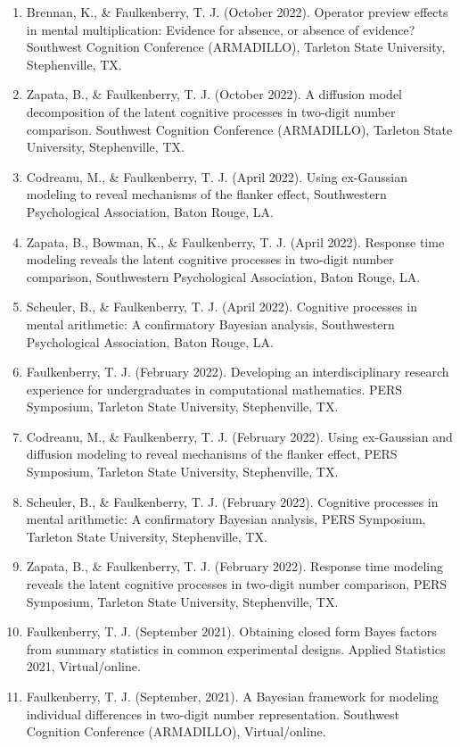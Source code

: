 \documentclass[article,10pt]{article}
\begin{document}
\begin{enumerate}
\item Brennan, K., \& Faulkenberry, T. J. (October 2022). Operator preview effects in mental multiplication: Evidence for absence, or absence of evidence? Southwest Cognition Conference (ARMADILLO), Tarleton State University, Stephenville, TX.
\item Zapata, B., \& Faulkenberry, T. J. (October 2022). A diffusion model decomposition of the latent cognitive processes in two-digit number comparison. Southwest Cognition Conference (ARMADILLO), Tarleton State University, Stephenville, TX.
\item Codreanu, M., \& Faulkenberry, T. J. (April 2022). Using ex-Gaussian modeling to reveal mechanisms of the flanker effect, Southwestern Psychological Association, Baton Rouge, LA.
\item Zapata, B., Bowman, K., \& Faulkenberry, T. J. (April 2022). Response time modeling reveals the latent cognitive processes in two-digit number comparison, Southwestern Psychological Association, Baton Rouge, LA.
\item Scheuler, B., \& Faulkenberry, T. J. (April 2022). Cognitive processes in mental arithmetic: A confirmatory Bayesian analysis, Southwestern Psychological Association, Baton Rouge, LA.
\item Faulkenberry, T. J. (February 2022). Developing an interdisciplinary research experience for undergraduates in computational mathematics. PERS Symposium, Tarleton State University, Stephenville, TX.
\item Codreanu, M., \& Faulkenberry, T. J. (February 2022). Using ex-Gaussian and diffusion modeling to reveal mechanisms of the flanker effect, PERS Symposium, Tarleton State University, Stephenville, TX.
\item Scheuler, B., \& Faulkenberry, T. J. (February 2022). Cognitive processes in mental arithmetic: A confirmatory Bayesian analysis, PERS Symposium, Tarleton State University, Stephenville, TX.
\item Zapata, B., \& Faulkenberry, T. J. (February 2022). Response time modeling reveals the latent cognitive processes in two-digit number comparison, PERS Symposium, Tarleton State University, Stephenville, TX.
\item Faulkenberry, T. J. (September 2021). Obtaining closed form Bayes factors from summary statistics in common experimental designs. Applied Statistics 2021, Virtual/online.
\item Faulkenberry, T. J. (September, 2021). A Bayesian framework for modeling individual differences in two-digit number representation. Southwest Cognition Conference (ARMADILLO), Virtual/online.

\end{enumerate}
\end{document}
